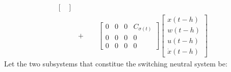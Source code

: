 \documentclass[twocolumn]{autart}    %
\begin{document}
\begin{exmp}
\begin{equation}
\begin{aligned}
\begin{bmatrix}
            \end{bmatrix} \\
            &+ \qquad \begin{bmatrix}
                0 & 0 & 0 & C_{\sigma(t)}\\
                0 & 0 & 0 & 0\\
                0 & 0 & 0 & 0
            \end{bmatrix} \begin{bmatrix}
                x(t-h) \\
                w(t-h) \\
                u(t-h) \\
                \dot{x}(t-h)
            \end{bmatrix}
        \end{aligned}
    \end{equation}
    Let the two subsystems that constitue the switching neutral system be:


\end{exmp}
\end{document}
